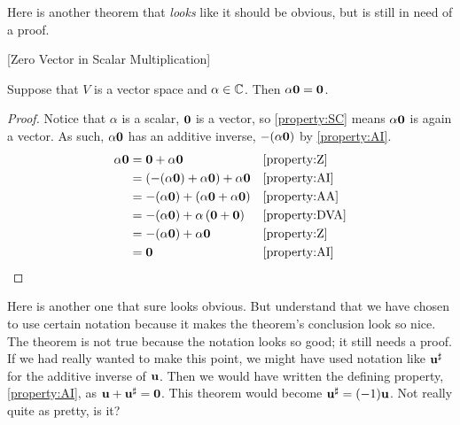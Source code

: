 \documentclass{ximera}
\begin{document}
Here is another theorem that \textit{looks} like it should be obvious, but is still in need of a proof.

\begin{theorem}
  \label{theorem:ZVSM}
  [Zero Vector in Scalar Multiplication]
  
  Suppose that $V$ is a vector space and $\alpha\in\mathbb{C}$.   Then $\alpha\mathbf{0}=\mathbf{0}$.

  \begin{proof}
    Notice that $\alpha$ is a scalar, $\mathbf{0}$ is a vector, so \ref{property:SC} means $\alpha\mathbf{0}$ is again a vector.  As such, $\alpha\mathbf{0}$ has an additive inverse, $-(\alpha\mathbf{0})$ by \ref{property:AI}.
    \begin{align*}
      \alpha\mathbf{0}
      &=\mathbf{0}+\alpha\mathbf{0}&&\ref{property:Z}\\
      &=\left(-(\alpha\mathbf{0})+\alpha\mathbf{0}\right)+\alpha\mathbf{0}&&\ref{property:AI}\\
      &=-(\alpha\mathbf{0})+\left(\alpha\mathbf{0}+\alpha\mathbf{0}\right)&&\ref{property:AA}\\
      &=-(\alpha\mathbf{0})+\alpha\left(\mathbf{0}+\mathbf{0}\right)&&\ref{property:DVA}\\
      &=-(\alpha\mathbf{0})+\alpha\mathbf{0}&&\ref{property:Z}\\
      &=\mathbf{0}&&\ref{property:AI}
    \end{align*}
  \end{proof}
\end{theorem}

Here is another one that sure looks obvious.  But understand that we
have chosen to use certain notation because it makes the theorem's
conclusion look so nice.  The theorem is not true because the notation
looks so good; it still needs a proof.  If we had really wanted to
make this point, we might have used notation like $\mathbf{u}^\sharp$
for the additive inverse of $\mathbf{u}$.  Then we would have written
the defining property, \ref{property:AI}, as
$\mathbf{u}+\mathbf{u}^\sharp=\mathbf{0}$.  This theorem would become
$\mathbf{u}^\sharp=(-1)\mathbf{u}$.  Not really quite as pretty, is it?
\end{document}
